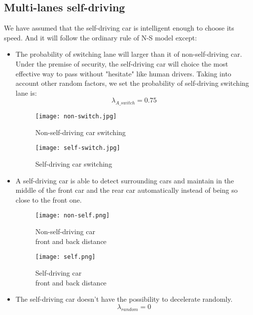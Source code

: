 \documentclass{mcmthesis}
\numberwithin{equation}{section}
\begin{document}
		\subsection{Multi-lanes self-driving}
			We have assumed that the self-driving car is intelligent enough to choose its speed. And it will follow the ordinary rule of N-S model except:
			\begin{itemize}
				\item The probability of switching lane will larger than it of non-self-driving car. Under the premise of security, the self-driving car will choice the most effective way to pass without "hesitate" like human drivers. Taking into account other random factors, we set the probability of self-driving switching lane is:
				\begin{equation}
					\lambda_{A\_switch} = 0.75
				\end{equation}
				\begin{figure}[H]
					\begin{minipage}[H]{0.5\linewidth}
						\centering
						\texttt{[image: non-switch.jpg]}
						\caption{Non-self-driving car switching}
					\end{minipage}%
					\begin{minipage}[H]{0.5\linewidth}
						\centering
						\texttt{[image: self-switch.jpg]}
						\caption{Self-driving car switching}
					\end{minipage}
				\end{figure}
				\item A self-driving car is able to detect surrounding cars and maintain in the middle of the front car and the rear car automatically instead of being so close to the front one.
				\begin{figure}[H]
					\begin{minipage}[H]{0.5\linewidth}
						\centering
						\texttt{[image: non-self.png]}
						\caption{Non-self-driving car\protect\\front and back distance}
					\end{minipage}%
					\begin{minipage}[H]{0.5\linewidth}
						\centering
						\texttt{[image: self.png]}
						\caption{Self-driving car\protect\\front and back distance}
					\end{minipage}
				\end{figure}
				\item The self-driving car doesn't have the possibility to decelerate randomly.
				\begin{equation}
					\lambda_{random}=0
				\end{equation}
			\end{itemize}
\end{document}
